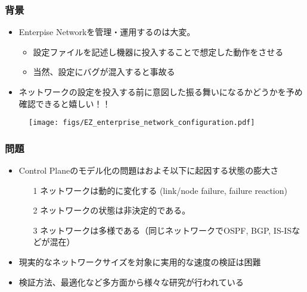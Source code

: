 \documentclass[dvipdfmx,9pt,notheorems]{beamer}
\theoremstyle{definition}
\begin{document}
\begin{frame}\frametitle{背景}
\begin{itemize}
	\item Enterpise Networkを管理・運用するのは大変。
	\begin{itemize}
		\item 設定ファイルを記述し機器に投入することで想定した動作をさせる
		\item 当然、設定にバグが混入すると事故る
	\end{itemize}
	\item ネットワークの設定を投入する前に意図した振る舞いになるかどうかを予め確認できると嬉しい！！
\end{itemize}
\begin{figure}[htb]
  \centering
  \texttt{[image: figs/EZ\_enterprise\_network\_configuration.pdf]}
\end{figure}%
\pnote{
}
\end{frame}


\begin{frame}\frametitle{問題}
\begin{itemize}
	\item Control Planeのモデル化の問題はおよそ以下に起因する状態の膨大さ
	\begin{itemize}
		\item[1] ネットワークは動的に変化する (link/node failure, failure reaction)
		\item[2] ネットワークの状態は非決定的である。
		\item[3] ネットワークは多様である（同じネットワークでOSPF, BGP, IS-ISなどが混在）
	\end{itemize}
	\item 現実的なネットワークサイズを対象に実用的な速度の検証は困難
	\item 検証方法、最適化など多方面から様々な研究が行われている
\end{itemize}
\pnote{
}
\end{frame}
\end{document}
